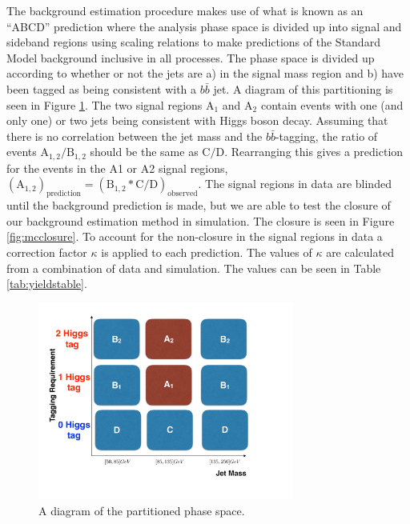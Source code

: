 The background estimation procedure makes use of what is known as an ``ABCD'' prediction where the analysis phase space is divided up into signal and sideband regions using scaling relations to make predictions of the Standard Model background inclusive in all processes. The phase space is divided up according to whether or not the jets are a) in the signal mass region and b) have been tagged as being consistent with a $b\bar{b}$ jet. A diagram of this partitioning is seen in Figure \ref{fig:abcd}. The two signal regions $\mathrm{A}_{1}$ and $\mathrm{A}_{2}$ contain events with one (and only one) or two jets being consistent with Higgs boson decay. Assuming that there is no correlation between the jet mass and the $b\bar{b}$-tagging, the ratio of events $\mathrm{A}_{1, 2} / \mathrm{B}_{1, 2}$ should be the same as $\mathrm{C} / \mathrm{D}$. Rearranging this gives a prediction for the events in the A1 or A2 signal regions, $\left(\mathrm{A}_{1, 2}\right)_{\mathrm{prediction}} = \left(\mathrm{B}_{1, 2} * \mathrm{C} / \mathrm{D}\right)_{\mathrm{observed}}$. The signal regions in data are blinded until the background prediction is made, but we are able to test the closure of our background estimation method in simulation. The closure is seen in Figure \ref{fig:mcclosure}. To account for the non-closure in the signal regions in data a correction factor $\kappa$ is applied to each prediction. The values of $\kappa$ are calculated from a combination of data and simulation. The values can be seen in Table \ref{tab:yieldstable}.

\begin{figure}[htbp]
\begin{centering}
\includegraphics[width=0.75\textwidth]{figs/CMS-SUS-17-006_Figure-aux_002.pdf}
\caption{A diagram of the partitioned phase space.}
\label{fig:abcd}
\end{centering}
\end{figure}

